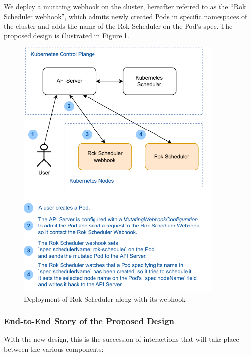 We deploy a mutating webhook on the cluster, hereafter referred to as the ``Rok
Scheduler webhook'', which admits newly created Pods in specific namespaces of
the cluster and adds the name of the Rok Scheduler on the Pod's spec. The
proposed design is illustrated in Figure \ref{fig:rok-scheduler-webhook}.


\begin{figure}[ht]
      \centering
      \includegraphics[width=0.9\textwidth]{resources/webhook-design.pdf}
      \caption{Deployment of Rok Scheduler along with its webhook}
      \label{fig:rok-scheduler-webhook}
\end{figure}


\subsubsection{End-to-End Story of the Proposed Design}

With the new design, this is the succession of interactions that will take place
between the various components:

